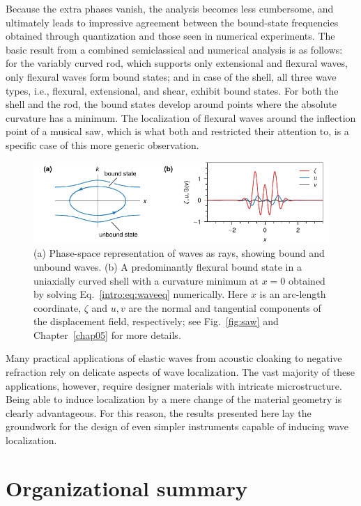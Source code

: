 Because the extra phases vanish, the analysis becomes less cumbersome, and ultimately leads to impressive agreement between the bound-state frequencies obtained through quantization and those seen in numerical experiments.
The basic result from a combined semiclassical and numerical analysis is as follows: for the variably curved rod, which supports only extensional and flexural waves, only flexural waves form bound states; and in case of the shell, all three wave types, i.e., flexural, extensional, and shear, exhibit bound states.
For both the shell and the rod, the bound states develop around points where the absolute curvature has a minimum.
The localization of flexural waves around the inflection point of a musical saw, which is what both \citet{scott1992} and \citet{shankar2022} restricted their attention to, is a specific case of this more generic observation.
%
\begin{figure}
  \begin{center}
    \includegraphics{figures/intro/phasespace.pdf}
  \end{center}
  \caption{(a) Phase-space representation of waves as rays, showing bound and unbound waves. (b) A predominantly flexural bound state in a uniaxially curved shell with a curvature minimum at $x = 0$ obtained by solving Eq.~\eqref{intro:eq:waveeq} numerically.
  Here $x$ is an arc-length coordinate, $\zeta$ and $u, v$ are the normal and tangential components of the displacement field, respectively; see Fig.~\ref{fig:saw} and Chapter~\ref{chap05} for more details.}
  \label{fig:phasespace}
\end{figure}
%
Many practical applications of elastic waves from acoustic cloaking to negative refraction rely on delicate aspects of wave localization.
The vast majority of these applications, however, require designer materials with intricate microstructure.
Being able to induce localization by a mere change of the material geometry is clearly advantageous.
For this reason, the results presented here lay the groundwork for the design of even simpler instruments capable of inducing wave localization.

\section{Organizational summary}

